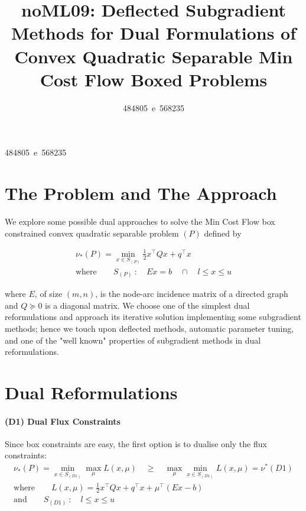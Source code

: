 \documentclass[10pt,twoside,book,a5paper]{ncc}
\begin{document}
\title{noML09: Deflected Subgradient Methods for Dual Formulations of Convex Quadratic Separable Min Cost Flow Boxed Problems}
\author{484805~e~568235}{484805~e~568235}
\maketitle	


\section*{The Problem and The Approach}

We explore some possible dual approaches to solve the Min Cost Flow box constrained convex quadratic separable problem $(P)$ defined by

\begin{gather*}
\nu_*(P) = \min_{x \in S_{(P)}} \frac{1}{2} x^\intercal Q x + q^\intercal x \\
\textrm{where} \qquad S_{(P)} \: :\quad E x = b \quad \cap \quad l \le x \le u
\end{gather*}

where $E$, of size $(m, n)$, is the node-arc incidence matrix of a directed graph and $Q\succcurlyeq 0$ is a diagonal matrix.
We choose one of the simplest dual reformulations and approach its iterative solution implementing some subgradient methods; hence we touch upon deflected methods, automatic parameter tuning, and one of the "well known" properties of subgradient methods in dual reformulations.

\section{Dual Reformulations}
\label{base-section}

\paragraph{(D1) Dual Flux Constraints}
Since box constraints are easy, the first option is to dualise only the flux constraints:
\begin{gather*}
    \nu_*(P) = \min_{x \in S_{(D1)}} \max_{\mu} L(x, \mu) \quad\ge\quad \max_{\mu} \min_{x \in S_{(D1)}} L(x, \mu) = \nu^*(D1)  \\
   \textrm{where}\qquad  L(x, \mu) = \frac{1}{2} x^\intercal Q x + q^\intercal x + \mu^\intercal (E x - b)  \\
    \textrm{and}\qquad  S_{(D1)} \: :\quad l \le x \le u
\end{gather*}
\end{document}
